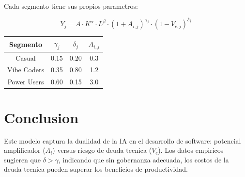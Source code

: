 \documentclass{article}
\begin{document}
Cada segmento tiene sus propios parametros:

\begin{equation}
Y_j = A \cdot K^{\alpha} \cdot L^{\beta} \cdot (1 + A_{i,j})^{\gamma_j} \cdot (1 - V_{c,j})^{\delta_j}
\end{equation}

\begin{table}[h]
\centering
\begin{tabular}{|c|c|c|c|}
\hline
\textbf{Segmento} & $\gamma_j$ & $\delta_j$ & $A_{i,j}$ \\
\hline
Casual & 0.15 & 0.20 & 0.3 \\
Vibe Coders & 0.35 & 0.80 & 1.2 \\
Power Users & 0.60 & 0.15 & 3.0 \\
\hline
\end{tabular}
\end{table}

\section{Conclusion}

Este modelo captura la dualidad de la IA en el desarrollo de software: potencial amplificador ($A_i$) versus riesgo de deuda tecnica ($V_c$). Los datos empiricos sugieren que $\delta > \gamma$, indicando que sin gobernanza adecuada, los costos de la deuda tecnica pueden superar los beneficios de productividad.
\end{document}
